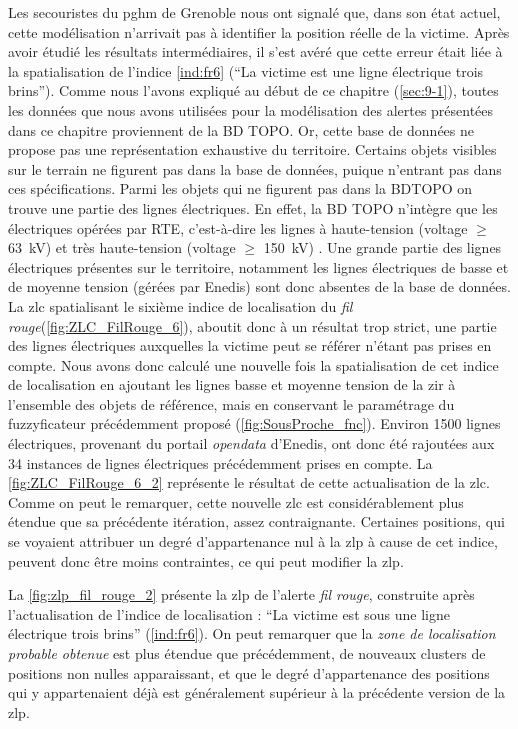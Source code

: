Les secouristes du \ac{pghm} de Grenoble nous ont signalé que, dans
son état actuel, cette modélisation n'arrivait pas à identifier la
position réelle de la victime. Après avoir étudié les résultats
intermédiaires, il s'est avéré que cette erreur était liée à la
spatialisation de l'indice \ref{ind:fr6} (\enquote{La victime est
   une ligne électrique trois
  brins}). Comme nous l'avons expliqué au début de ce chapitre
(\autoref{sec:9-1}), toutes les données que nous avons utilisées pour
la modélisation des alertes présentées dans ce chapitre proviennent de
la BD TOPO. Or, cette base de données ne propose pas une
représentation exhaustive du territoire. Certains objets visibles sur
le terrain ne figurent pas dans la base de données, puique n'entrant
pas dans ces spécifications. Parmi les objets qui ne figurent pas dans
la BDTOPO on trouve une partie des lignes électriques. En effet, la BD
TOPO n'intègre que les électriques opérées par RTE, c'est-à-dire les
lignes à haute-tension (voltage $≥$ \SI{63}{\kilo\volt}) et très
haute-tension (voltage $≥$ \SI{150}{\kilo\volt})
\autocite{IGN2020}. Une grande partie des lignes électriques présentes
sur le territoire, notamment les lignes électriques de basse et de
moyenne tension (gérées par Enedis) sont donc absentes de la base de
données.
%
La \ac{zlc} spatialisant le sixième indice de localisation du
\emph{fil rouge}(\autoref{fig:ZLC_FilRouge_6}), aboutit donc à un
résultat trop strict, une partie des lignes électriques auxquelles la
victime peut se référer n'étant pas prises en compte. Nous avons donc
calculé une nouvelle fois la spatialisation de cet indice de
localisation en ajoutant les lignes basse et moyenne tension de la
\ac{zir} à l'ensemble des objets de référence, mais en conservant le
paramétrage du fuzzyficateur précédemment proposé
(\autoref{fig:SousProche_fnc}). Environ \num{1500} lignes électriques,
provenant du portail \emph{opendata} d'Enedis, ont donc été rajoutées
aux \num{34} instances de lignes électriques précédemment prises en
compte. La \autoref{fig:ZLC_FilRouge_6_2} représente le résultat de
cette actualisation de la \ac{zlc}. Comme on peut le remarquer, cette
nouvelle \ac{zlc} est considérablement plus étendue que sa précédente
itération, assez contraignante. Certaines positions, qui se voyaient
attribuer un degré d'appartenance nul à la \ac{zlp} à cause de cet
indice, peuvent donc être moins contraintes, ce qui peut modifier la
\ac{zlp}.

La \autoref{fig:zlp_fil_rouge_2} présente la \ac{zlp} de l'alerte
\emph{fil rouge}, construite après l'actualisation de l'indice de
localisation : \enquote{La victime est sous une ligne électrique trois
  brins} (\ref{ind:fr6}). On peut remarquer que la \emph{zone de
  localisation probable obtenue} est plus étendue que précédemment, de
nouveaux clusters de positions non nulles apparaissant, et que le
degré d'appartenance des positions qui y appartenaient déjà est
généralement supérieur à la précédente version de la \ac{zlp}.

